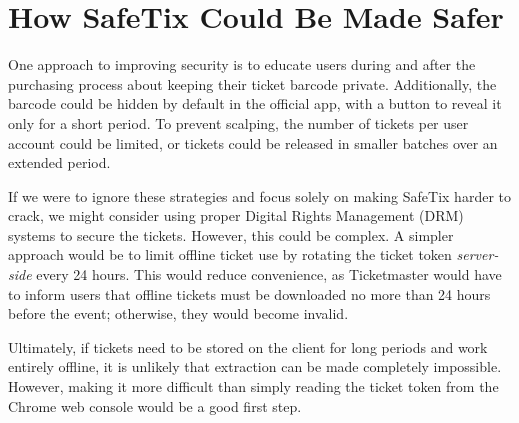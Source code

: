 \section{How SafeTix Could Be Made Safer}

One approach to improving security is to educate users during and after the purchasing process 
about keeping their ticket barcode private. Additionally, the barcode could be hidden by default 
in the official app, with a button to reveal it only for a short period. To prevent scalping, 
the number of tickets per user account could be limited, or tickets could be released in smaller 
batches over an extended period.

If we were to ignore these strategies and focus solely on making SafeTix harder to crack, we might
consider using proper Digital Rights Management (DRM) systems to secure the tickets. However, 
this could be complex. A simpler approach would be to limit offline ticket use by rotating the 
ticket token \textit{server-side} every 24 hours. This would reduce convenience, as Ticketmaster 
would have to inform users that offline tickets must be downloaded no more than 24 hours before 
the event; otherwise, they would become invalid.

Ultimately, if tickets need to be stored on the client for long periods and work entirely offline, 
it is unlikely that extraction can be made completely impossible. However, making it more difficult 
than simply reading the ticket token from the Chrome web console would be a good first step.
